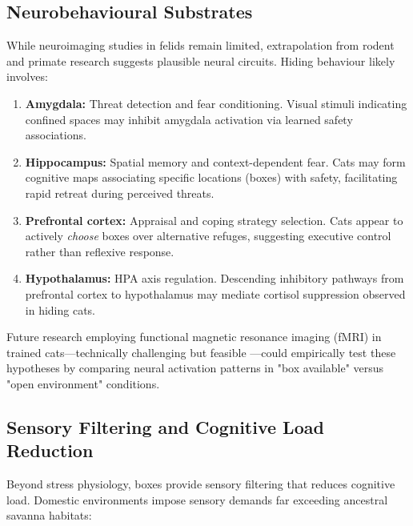 \documentclass[12pt,a4paper]{article}
\begin{document}
\subsection{Neurobehavioural Substrates}

While neuroimaging studies in felids remain limited, extrapolation from rodent and primate research suggests plausible neural circuits. Hiding behaviour likely involves:

\begin{enumerate}
    \item \textbf{Amygdala:} Threat detection and fear conditioning. Visual stimuli indicating confined spaces may inhibit amygdala activation via learned safety associations.
    
    \item \textbf{Hippocampus:} Spatial memory and context-dependent fear. Cats may form cognitive maps associating specific locations (boxes) with safety, facilitating rapid retreat during perceived threats.
    
    \item \textbf{Prefrontal cortex:} Appraisal and coping strategy selection. Cats appear to actively \textit{choose} boxes over alternative refuges, suggesting executive control rather than reflexive response.
    
    \item \textbf{Hypothalamus:} HPA axis regulation. Descending inhibitory pathways from prefrontal cortex to hypothalamus may mediate cortisol suppression observed in hiding cats.
\end{enumerate}

Future research employing functional magnetic resonance imaging (fMRI) in trained cats—technically challenging but feasible \citep{johnson2021}—could empirically test these hypotheses by comparing neural activation patterns in "box available" versus "open environment" conditions.

\subsection{Sensory Filtering and Cognitive Load Reduction}

Beyond stress physiology, boxes provide sensory filtering that reduces cognitive load. Domestic environments impose sensory demands far exceeding ancestral savanna habitats:
\end{document}

